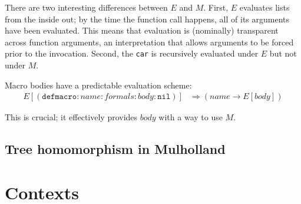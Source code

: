 \documentclass{report}
\begin{document}
    There are two interesting differences between $E$ and $M$. First, $E$ evaluates lists from the inside out; by the time the function call happens, all of its arguments have been evaluated.
    This means that evaluation is (nominally) transparent across function arguments, an interpretation that allows arguments to be forced prior to the invocation. Second, the {\tt car} is
    recursively evaluated under $E$ but not under $M$.

    Macro bodies have a predictable evaluation scheme:
\begin{align*}
E[(\texttt{defmacro}:name:formals:body:\texttt{nil})] & \Rightarrow (name \rightarrow E[body])
\end{align*}

    This is crucial; it effectively provides $body$ with a way to use $M$.

\section{Tree homomorphism in Mulholland}
    

\chapter{Contexts}\label{sec:contexts}
\end{document}
